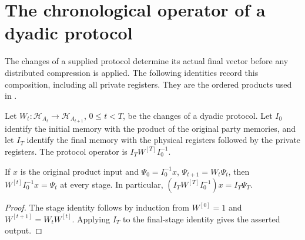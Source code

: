 \section{The chronological operator of a dyadic protocol}
\label{sec:peps_dyadic_protocol_circuit}

The changes of a supplied protocol determine its actual final vector before
any distributed compression is applied. The following identities record this
composition, including all private registers. They are the ordered products
used in \cite[Section~8.1]{OpenAI2026PolynomialPEPS}.

\begin{definition}
    \label{def:peps_dyadic_protocol_operator}
    \leanok
    Let $W_t:\mathcal H_{A_t}\to\mathcal H_{A_{t+1}}$, $0\le t<T$,
    be the changes of a dyadic protocol. Let $I_0$ identify the initial memory
    with the product of the original party memories, and let $I_T$ identify
    the final memory with the physical registers followed by the private
    registers. The protocol operator is $I_T W^{[T]} I_0^{-1}$.
\end{definition}

\begin{theorem}
    \label{thm:peps_dyadic_protocol_operator_eval}
    \leanok
    If $x$ is the original product input and
    $\Psi_0=I_0^{-1}x$, $\Psi_{t+1}=W_t\Psi_t$, then
    $W^{[t]}I_0^{-1}x=\Psi_t$ at every stage. In particular,
    $(I_T W^{[T]}I_0^{-1})x=I_T\Psi_T$.
\end{theorem}
\begin{proof}\leanok
    The stage identity follows by induction from
    $W^{[0]}=1$ and $W^{[t+1]}=W_tW^{[t]}$.
    Applying $I_T$ to the final-stage identity gives the asserted output.
\end{proof}

